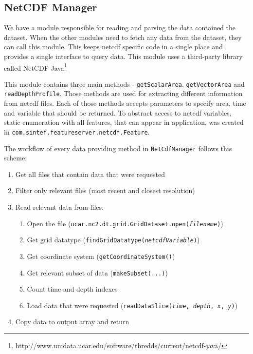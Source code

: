 \documentclass[11pt,a4paper,titlepage,oneside]{report}
\begin{document}
\subsection{NetCDF Manager}
We have a module responsible for reading and parsing the data contained the dataset. When the other modules need to fetch any data from the dataset, they can call this module. This keeps \gls{netcdf} specific code in a single place and provides a single interface to query data.
This module uses a third-party library called NetCDF-Java\footnote{http://www.unidata.ucar.edu/software/thredds/current/netcdf-java/}

This module contains three main methods - \texttt{getScalarArea}, \texttt{getVectorArea} and \texttt{readDepthProfile}. Those methods are used for extracting different information from \gls{netcdf} files. Each of those methods accepts parameters to specify area, time and variable that should be returned. To abstract access to \gls{netcdf} variables, static enumeration with all features, that can appear in application, was created in \texttt{com.sintef.featureserver.netcdf.Feature}.

The workflow of every data providing method in \texttt{NetCdfManager} follows this scheme:
\begin{enumerate}
    \item Get all files that contain data that were requested
    \item Filter only relevant files (most recent and closest resolution)
    \item Read relevant data from files:
    \begin{enumerate}
        \item Open the file (\texttt{ucar.nc2.dt.grid.GridDataset.open(\textit{filename})})
        \item Get grid datatype (\texttt{findGridDatatype(\textit{netcdfVariable})})
        \item Get coordinate system (\texttt{getCoordinateSystem()})
        \item Get relevant subset of data (\texttt{makeSubset(...)})
        \item Count time and depth indexes
        \item Load data that were requested (\texttt{readDataSlice(\textit{time}, \textit{depth}, \textit{x}, \textit{y})})
    \end{enumerate}
    \item Copy data to output array and return
\end{enumerate}
\end{document}
